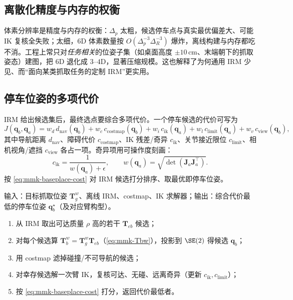 \subsection{离散化精度与内存的权衡}
\label{sec:mmk-discretize}

体素分辨率是精度与内存的权衡：$\Delta_p$ 太粗，候选停车点与真实最优偏差大、可能 IK 复核全失败；太细，$6$D 体素数量按 $O(\Delta_p^{-3}\Delta_R^{-3})$ 爆炸，离线构建与内存都吃不消。工程上常只对\emph{任务相关}的位姿子集（如桌面高度 $\pm10\,$cm、末端朝下的抓取姿态）建图，把 $6$D 退化成 $3$--$4$D，显著压缩规模。这也解释了为何通用 IRM 少见、而“面向某类抓取任务的定制 IRM”更实用。

\subsection{停车位姿的多项代价}
\label{sec:mmk-baseplace}

IRM 给出候选集后，最终选点要综合多项代价。一个停车候选的代价可写为
\begin{equation}
  J(\mathbf{q}_b,\mathbf{q}_a)=
  w_d\,d_{\text{nav}}(\mathbf{q}_b)
  +w_c\,c_{\text{costmap}}(\mathbf{q}_b)
  +w_i\,c_{\text{ik}}(\mathbf{q}_a)
  +w_l\,c_{\text{limit}}(\mathbf{q}_a)
  +w_v\,c_{\text{view}}(\mathbf{q}_b),
  \label{eq:mmk-baseplace-cost}
\end{equation}
其中导航距离 $d_{\text{nav}}$、障碍代价 $c_{\text{costmap}}$、IK 残差/奇异 $c_{\text{ik}}$、关节接近限位 $c_{\text{limit}}$、相机视角/遮挡 $c_{\text{view}}$ 各占一项。奇异项用可操作度刻画：
\begin{equation}
  c_{\text{ik}}=\frac{1}{w(\mathbf{q}_a)+\epsilon},\qquad w(\mathbf{q}_a)=\sqrt{\det(\mathbf{J}_a\mathbf{J}_a^\top)}.
  \label{eq:mmk-cik}
\end{equation}
按 \cref{eq:mmk-baseplace-cost} 对 IRM 候选打分排序、取最优即停车位姿。

\begin{algo}\label{alg:mmk-baseplace}
输入：目标抓取位姿 $\mathbf{T}_g^w$、离线 IRM、costmap、IK 求解器；输出：综合代价最低的停车位姿 $\mathbf{q}_b^\star$（及对应臂构型）。
\begin{enumerate}
  \item 从 IRM 取出可达质量 $\rho$ 高的若干 $\mathbf{T}_{eb}$ 候选；
  \item 对每个候选算 $\mathbf{T}_b^w=\mathbf{T}_g^w\mathbf{T}_{eb}$（\cref{eq:mmk-Tbw}），投影到 $\SE(2)$ 得候选 $\mathbf{q}_b$；
  \item 用 costmap 滤掉碰撞/不可导航的候选；
  \item 对幸存候选解一次臂 IK，复核可达、无碰、远离奇异（更新 $c_{\text{ik}},c_{\text{limit}}$）；
  \item 按 \cref{eq:mmk-baseplace-cost} 打分，返回代价最低者。
\end{enumerate}
\end{algo}


